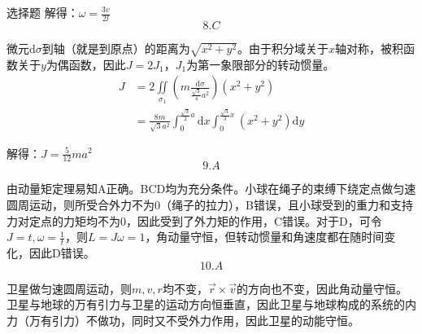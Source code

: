 \documentclass[a4paper,fleqn,twocolumn]{ctexart}
\newcommand{\di}[1]{\mathrm{d}#1}
\newcommand{\zbj}[4]
{
\draw (0,0) node[below left] {$ O $};
\draw [->] (#1,0) -- (#2,0) node[right] {$ x $};
\draw [->] (0,#3) -- (0,#4) node[right] {$ y $};
}
\begin{document}
\begin{section}{选择题}
		解得：$\omega=\frac{3v}{2l}$
		\[8.C\]\par
		\par
		微元$ \di{\sigma} $到轴（就是到原点）的距离为$ \sqrt{x^2+y^2} $。由于积分域关于$ x $轴对称，被积函数关于$ y $为偶函数，因此$ J=2J_1 $，$ J_1 $为第一象限部分的转动惯量。
		\begin{align*}
		J&=2\iint\limits_{\sigma_1}\left(m\frac{\di{\sigma}}{\frac{\sqrt{3}}{4}a^2}\right)(x^2+y^2)\\
		&=\frac{8m}{\sqrt{3}a^2}\int_0^{\frac{\sqrt{3}}{2}a}\di{x}\int_0^{\frac{\sqrt{3}}{3}x}(x^2+y^2)\di{y}
		\end{align*}\par
		解得：$ J=\frac{5}{12}ma^2 $
		\[9.A\]\par
		由动量矩定理易知A正确。BCD均为充分条件。小球在绳子的束缚下绕定点做匀速圆周运动，则所受合外力不为0（绳子的拉力），B错误，且小球受到的重力和支持力对定点的力矩均不为0，因此受到了外力矩的作用，C错误。对于D，可令$ J=t,\omega=\frac{1}{t} $，则$ L=J\omega=1 $，角动量守恒，但转动惯量和角速度都在随时间变化，因此D错误。
		\[10.A\]\par
		卫星做匀速圆周运动，则$ m,v,r $均不变，$ \vec{r}\times\vec{v} $的方向也不变，因此角动量守恒。卫星与地球的万有引力与卫星的运动方向恒垂直，因此卫星与地球构成的系统的内力（万有引力）不做功，同时又不受外力作用，因此卫星的动能守恒。
	\end{section}
\end{document}
